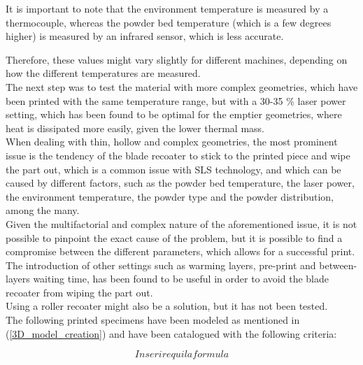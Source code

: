\documentclass{article}
\begin{document}
        It is important to note that the environment temperature is measured by a thermocouple, whereas the 
        powder bed temperature (which is a few degrees higher) is measured by an infrared sensor, which  
        is less accurate. 

        Therefore, these values might vary slightly for different machines, depending on how the different 
        temperatures are measured. \\ 

        The next step was to test the material with more complex geometries, which have been printed with the same 
        temperature range, but with a 30-35 \% laser power setting, which has been found to be optimal for the 
        emptier geometries, where heat is dissipated more easily, given the lower thermal mass. \\ 

        When dealing with thin, hollow and complex geometries, the most prominent issue is the tendency of the 
        blade recoater to stick to the printed piece and wipe the part out, which is a common 
        issue with SLS technology, and which 
        can be caused by different factors, such as the powder bed temperature, the laser power, the 
        environment temperature, the powder type and the powder distribution, among the many. \\ 

        Given the multifactorial and complex nature of the aforementioned issue, it is not possible to 
        pinpoint the exact cause of the problem, but it is possible to find a compromise between the 
        different parameters, which allows for a successful print. \\
        
        The introduction of other settings such as warming layers, pre-print 
        and between-layers waiting time, has been found to be useful in order to avoid 
        the blade recoater from wiping the part out. \\

        Using a roller recoater might also be a solution, but it has not been tested. \\ 

        The following printed specimens have been modeled as mentioned in (\ref{3D_model_creation}) and 
        have been catalogued with the following criteria: 

        \begin{equation}
            Inserire qui la formula
        \end{equation}
\end{document}
